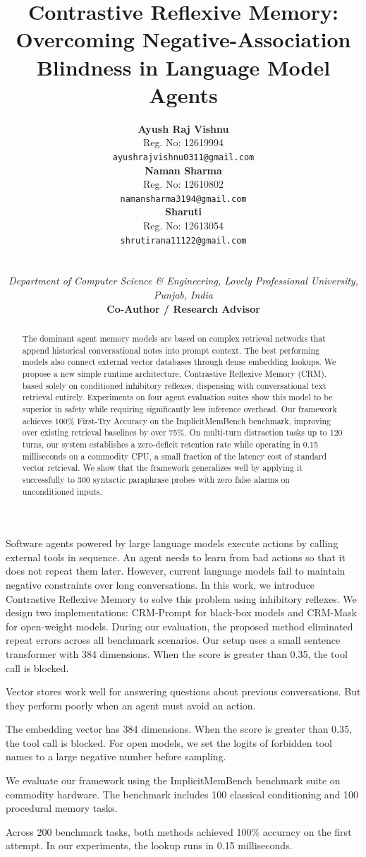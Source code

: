 \documentclass[10pt,conference]{IEEEtran}
\title{Contrastive Reflexive Memory: Overcoming Negative-Association Blindness in Language Model Agents}
\author{
\begin{minipage}{0.32\textwidth}
\centering
{\normalsize \textbf{Ayush Raj Vishnu}}\\[0.2ex]
{\small Reg. No: 12619994}\\[0.1ex]
{\footnotesize \texttt{ayushrajvishnu0311@gmail.com}}
\end{minipage}\hfill
\begin{minipage}{0.32\textwidth}
\centering
{\normalsize \textbf{Naman Sharma}}\\[0.2ex]
{\small Reg. No: 12610802}\\[0.1ex]
{\footnotesize \texttt{namansharma3194@gmail.com}}
\end{minipage}\hfill
\begin{minipage}{0.32\textwidth}
\centering
{\normalsize \textbf{Sharuti}}\\[0.2ex]
{\small Reg. No: 12613054}\\[0.1ex]
{\footnotesize \texttt{shrutirana11122@gmail.com}}
\end{minipage}\\[1.2ex]
\begin{minipage}{\textwidth}
\centering
{\small \textit{Department of Computer Science \& Engineering, Lovely Professional University, Punjab, India}}\\[1.2ex]
{\normalsize \textbf{Co-Author / Research Advisor}}\quad{\footnotesize \texttt{advisor@lpu.co.in}}
\end{minipage}
}
\begin{document}
\maketitle

\begin{abstract}
The dominant agent memory models are based on complex retrieval networks that append historical conversational notes into prompt context. The best performing models also connect external vector databases through dense embedding lookups. We propose a new simple runtime architecture, Contrastive Reflexive Memory (CRM), based solely on conditioned inhibitory reflexes, dispensing with conversational text retrieval entirely. Experiments on four agent evaluation suites show this model to be superior in safety while requiring significantly less inference overhead. Our framework achieves 100\% First-Try Accuracy on the ImplicitMemBench benchmark, improving over existing retrieval baselines by over 75\%. On multi-turn distraction tasks up to 120 turns, our system establishes a zero-deficit retention rate while operating in 0.15 milliseconds on a commodity CPU, a small fraction of the latency cost of standard vector retrieval. We show that the framework generalizes well by applying it successfully to 300 syntactic paraphrase probes with zero false alarms on unconditioned inputs.
\end{abstract}

Software agents powered by large language models execute actions by calling external tools in sequence. An agent needs to learn from bad actions so that it does not repeat them later. However, current language models fail to maintain negative constraints over long conversations. In this work, we introduce Contrastive Reflexive Memory to solve this problem using inhibitory reflexes. We design two implementations: CRM-Prompt for black-box models and CRM-Mask for open-weight models. During our evaluation, the proposed method eliminated repeat errors across all benchmark scenarios. Our setup uses a small sentence transformer with 384 dimensions. When the score is greater than 0.35, the tool call is blocked.

Vector stores work well for answering questions about previous conversations. But they perform poorly when an agent must avoid an action.

The embedding vector has 384 dimensions. When the score is greater than 0.35, the tool call is blocked. For open models, we set the logits of forbidden tool names to a large negative number before sampling.

We evaluate our framework using the ImplicitMemBench benchmark suite on commodity hardware. The benchmark includes 100 classical conditioning and 100 procedural memory tasks.

Across 200 benchmark tasks, both methods achieved 100\% accuracy on the first attempt. In our experiments, the lookup runs in 0.15 milliseconds.
\end{document}
